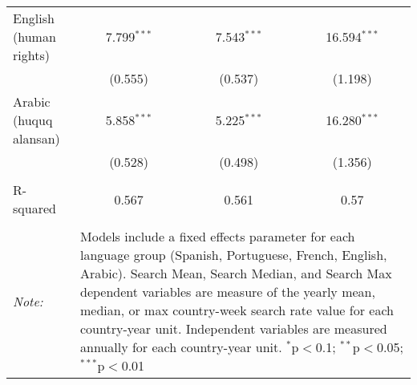 \begin{table}[!htbp]
\begin{tabular}{@{\extracolsep{5pt}}lccc}
  English (human rights) & 7.799$^{***}$ & 7.543$^{***}$ & 16.594$^{***}$ \\ 
  & (0.555) & (0.537) & (1.198) \\ 
  Arabic (huquq alansan) & 5.858$^{***}$ & 5.225$^{***}$ & 16.280$^{***}$ \\ 
  & (0.528) & (0.498) & (1.356) \\ 
 \hline \\[-1.8ex] 
R-squared  & 0.567 & 0.561 & 0.57 \\ 
\hline 
\hline \\[-1.8ex] 
\textit{Note:}  & \multicolumn{3}{l}{\parbox[t]{8cm}{Models include a fixed effects parameter for each language group (Spanish, Portuguese, French, English, Arabic). Search Mean, Search Median, and Search Max dependent variables are measure of the yearly mean, median, or max country-week search rate value for each country-year unit. Independent variables are measured annually for each country-year unit. $^{*}$p$<$0.1; $^{**}$p$<$0.05; $^{***}$p$<$0.01}} \\ 
\end{tabular} 
\end{table} 
